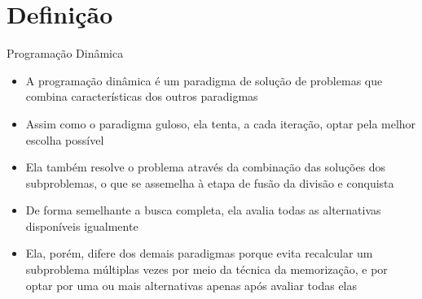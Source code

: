 \section{Definição}

\begin{frame}[fragile]{Programação Dinâmica}

    \begin{itemize}
        \item A programação dinâmica é um paradigma de solução de problemas que combina
            características dos outros paradigmas
        \pause

        \item Assim como o paradigma guloso, ela tenta, a cada iteração, optar pela melhor escolha possível
        \pause

        \item Ela também resolve o problema através da combinação das soluções dos subproblemas,
            o que se assemelha à etapa de fusão da divisão e conquista
        \pause

        \item De forma semelhante a busca completa, ela avalia todas as alternativas disponíveis
            igualmente
        \pause

        \item Ela, porém, difere dos demais paradigmas porque evita recalcular um subproblema
            múltiplas vezes por meio da técnica da memorização, e por optar por uma ou mais 
            alternativas apenas após avaliar todas elas
    \end{itemize}

\end{frame}

